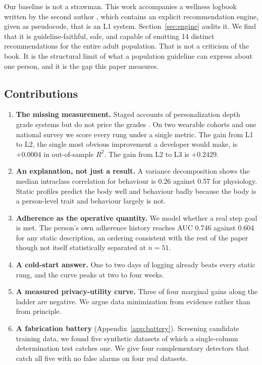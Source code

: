 \documentclass[conference]{IEEEtran}
\begin{document}
Our baseline is not a strawman. This work accompanies a wellness logbook written by the second author \cite{anderson2026logbook}, which contains an explicit recommendation engine, given as pseudocode, that is an L1 system. Section~\ref{sec:engine} audits it. We find that it is guideline-faithful, safe, and capable of emitting 14 distinct recommendations for the entire adult population. That is not a criticism of the book. It is the structural limit of what a population guideline can express about one person, and it is the gap this paper measures.

\subsection{Contributions}
\begin{enumerate}
\item \textbf{The missing measurement.} Staged accounts of personalization depth grade systems but do not price the grades \cite{tenklooster2024clarifying, matthews2025mentalhealth, alslaity2023panoramic}. On two wearable cohorts and one national survey we score every rung under a single metric. The gain from L1 to L2, the single most obvious improvement a developer would make, is $+0.0004$ in out-of-sample $R^2$. The gain from L2 to L3 is $+0.2429$.
\item \textbf{An explanation, not just a result.} A variance decomposition shows the median intraclass correlation for behaviour is 0.26 against 0.57 for physiology. Static profiles predict the body well and behaviour badly because the body is a person-level trait and behaviour largely is not.
\item \textbf{Adherence as the operative quantity.} We model whether a real step goal is met. The person's own adherence history reaches AUC 0.746 against 0.604 for any static description, an ordering consistent with the rest of the paper though not itself statistically separated at $n = 51$.
\item \textbf{A cold-start answer.} One to two days of logging already beats every static rung, and the curve peaks at two to four weeks.
\item \textbf{A measured privacy-utility curve.} Three of four marginal gains along the ladder are negative. We argue data minimization from evidence rather than from principle.
\item \textbf{A fabrication battery} (Appendix~\ref{app:battery}). Screening candidate training data, we found five synthetic datasets of which a single-column determination test catches one. We give four complementary detectors that catch all five with no false alarms on four real datasets.
\end{enumerate}
\end{document}
